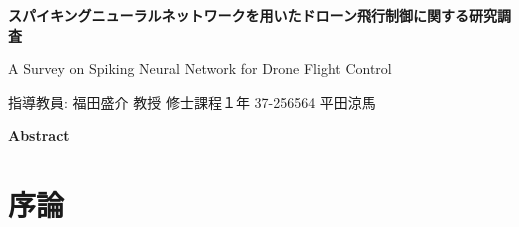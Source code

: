 \documentclass[a4paper,10.5pt,twocolumn]{bxjsarticle}
\begin{document}
\thispagestyle{fancy}

\begin{center}
  {\LARGE \bfseries スパイキングニューラルネットワークを用いたドローン飛行制御に関する研究調査 \par}
  \vspace{2mm}
  {\large A Survey on Spiking Neural Network for Drone Flight Control \par}
\end{center}

\vspace{5mm}

\noindent
指導教員: 福田盛介 教授
\hfill
修士課程１年 37-256564 平田涼馬

\vspace{10mm}

\begin{center}
  \bfseries Abstract
\end{center}
\lipsum[1] %

\vspace{5mm}

\section{序論}
\bxjlipsum[1] %

\section{}
\bxjlipsum[2-4] %

\section{}
\bxjlipsum[5-7] %
\end{document}
